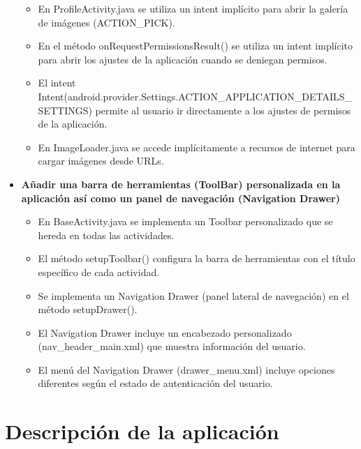 \documentclass[a4paper,10pt]{report}
\begin{document}
\begin{itemize}
\begin{itemize}
          \item En ProfileActivity.java se utiliza un intent implícito para abrir la galería de imágenes (ACTION\_PICK).
          \item En el método onRequestPermissionsResult() se utiliza un intent implícito para abrir los ajustes de la aplicación cuando se deniegan permisos.
          \item El intent Intent(android.provider.Settings.ACTION\_APPLICATION\_DETAILS\_SETTINGS) permite al usuario ir directamente a los ajustes de permisos de la aplicación.
          \item En ImageLoader.java se accede implícitamente a recursos de internet para cargar imágenes desde URLs.
        \end{itemize}
        \item \textbf{Añadir una barra de herramientas (ToolBar) personalizada en la aplicación así como un panel de navegación (Navigation Drawer)}
        \begin{itemize}
          \item En BaseActivity.java se implementa un Toolbar personalizado que se hereda en todas las actividades.
          \item El método setupToolbar() configura la barra de herramientas con el título específico de cada actividad.
          \item Se implementa un Navigation Drawer (panel lateral de navegación) en el método setupDrawer().
          \item El Navigation Drawer incluye un encabezado personalizado (nav\_header\_main.xml) que muestra información del usuario.
          \item El menú del Navigation Drawer (drawer\_menu.xml) incluye opciones diferentes según el estado de autenticación del usuario.
        \end{itemize}
      \end{itemize}
  \chapter{Descripción de la aplicación}
\end{document}
